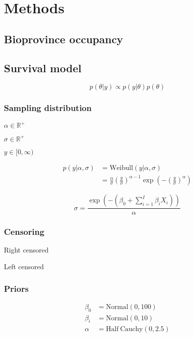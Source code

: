 \documentclass[12pt,letterpaper]{article}
\begin{document}
\section{Methods}

\subsection{Bioprovince occupancy}

\subsection{Survival model}

\begin{equation}
  p(\theta|y) \propto p(y|\theta) p(\theta)
  \label{eq:bayes}
\end{equation}

\subsubsection{Sampling distribution}

\(\alpha \in \mathbb{R}^{+}\)

\(\sigma \in \mathbb{R}^{+}\)

\(y \in [0, \infty)\)

\begin{align}
  p(y|\alpha, \sigma) &= \mathrm{Weibull}(y|\alpha, \sigma) \nonumber \\ 
  &= \frac{\alpha}{\sigma} \left(\frac{y}{\sigma}\right)^{\alpha - 1} \exp\left(-\left(\frac{y}{\sigma}\right)^{\alpha}\right)
  \label{eq:weibull}
\end{align}


\begin{equation}
  \sigma = \frac{\exp(-(\beta_{0} + \sum_{i = 1}^{I} \beta_{i} X_{i}))}{\alpha}
  \label{eq:reg}
\end{equation}

\subsubsection{Censoring}

Right censored

Left censored

\subsubsection{Priors}

\begin{align*}
  \beta_{0} &= \mathrm{Normal}(0, 100) \\
  \beta_{i} &= \mathrm{Normal}(0, 10) \\
  \alpha &= \mathrm{Half\ Cauchy}(0, 2.5)
\end{align*}
\end{document}
